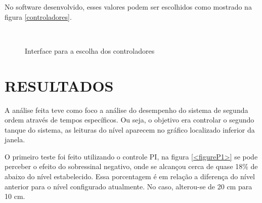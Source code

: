 \documentclass[a4paper,12pt]{article}
\begin{document}
\hspace{4ex}No software desenvolvido, esses valores podem ser escolhidos como mostrado na figura \ref{controladores}.

\begin{figure}[H]
     \centering
     \hspace{4ex}
     \\
     \caption{Interface para a escolha dos controladores}
     \label{fig:controladores}
\end{figure}


\newpage


\thispagestyle{main}

\section{RESULTADOS}

\hspace{4ex}A análise feita teve como foco a análise do desempenho do sistema de segunda ordem através de tempos específicos. Ou seja, o objetivo era controlar o segundo tanque do sistema, as leituras do nível aparecem no gráfico localizado inferior da janela.

\hspace{4ex}O primeiro teste foi feito utilizando o controle PI, na figura \ref{<figureP1>} se pode perceber o efeito do sobressinal negativo, onde se alcançou cerca de quase 18\% de  abaixo do nível estabelecido. Essa porcentagem é em relação a diferença do nível anterior para o nível configurado atualmente. No caso, alterou-se de 20 cm para 10 cm.
\end{document}
